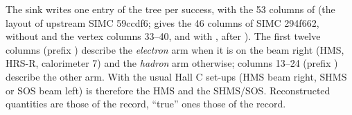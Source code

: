 The sink  writes one entry of the tree  per success, with the 53 columns of
 (the layout of upstream SIMC 59ccdf6;  gives the 46 columns of SIMC
294f662, without  and the vertex columns 33--40, and with ,  after ). The
first twelve columns (prefix ) describe the \emph{electron} arm when it is on the beam right (HMS, HRS-R,
calorimeter 7) and the \emph{hadron} arm otherwise; columns 13--24 (prefix ) describe the other arm. With the
usual Hall C set-ups (HMS beam right, SHMS or SOS beam left)  is therefore the HMS and  the SHMS/SOS.
Reconstructed quantities are those of the  record, ``true'' ones those of the  record.

